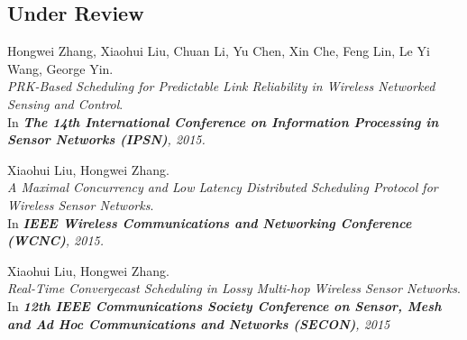 \subsection{Under Review}
\begin{thebibliography}{3}
Hongwei Zhang, Xiaohui Liu, Chuan Li, Yu Chen, Xin Che, Feng Lin, Le Yi Wang, George Yin.
\\ \newblock \emph{PRK-Based Scheduling for Predictable Link Reliability in Wireless Networked Sensing and Control}.
\\ \newblock In \emph{\textbf{The 14th International Conference on Information Processing in Sensor Networks (IPSN)}, 2015.}

Xiaohui Liu, Hongwei Zhang.
\\ \newblock \emph{A Maximal Concurrency and Low Latency Distributed Scheduling Protocol for Wireless Sensor Networks}.
\\ \newblock In \emph{\textbf{IEEE Wireless Communications and Networking Conference (WCNC)}, 2015.}

Xiaohui Liu, Hongwei Zhang.
\\ \newblock \emph{Real-Time Convergecast Scheduling in Lossy Multi-hop Wireless Sensor Networks}.
\\ \newblock In \emph{\textbf{12th IEEE Communications Society Conference on Sensor, Mesh and Ad Hoc Communications and Networks (SECON)}, 2015}

\end{thebibliography}
